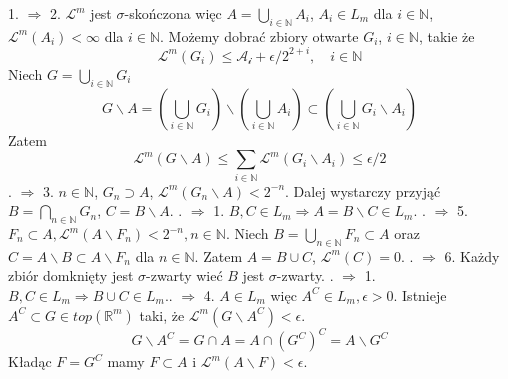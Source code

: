 
	1. $\Longrightarrow$ 2. $\mathcal{L}^m$ jest $\sigma$-skończona więc $A = \bigcup_{i \in \mathbb{N}} A_i$, $A_i \in L_m$ dla $i \in \mathbb{N}$, $\mathcal{L}^m(A_i) < \infty$ dla $i \in \mathbb{N}$. Możemy dobrać zbiory otwarte $G_i$, $i \in \mathbb{N}$, takie że $$ \mathcal{L}^m(G_i) \leq \mathcal{A_i} + \epsilon / 2^{2 + i}, \quad i \in \mathbb{N} $$  Niech $G = \bigcup_{i \in \mathbb{N}} G_i$ $$ G \backslash A = (\bigcup_{i \in \mathbb{N}} G_i) \backslash (\bigcup_{i \in \mathbb{N}} A_i) \subset (\bigcup_{i \in \mathbb{N}} G_i \backslash A_i) $$ Zatem $$ \mathcal{L}^m(G \backslash A) \leq \sum_{i \in \mathbb{N}} \mathcal{L}^m(G_i \backslash A_i) \leq \epsilon/2 $$. $\Longrightarrow$ 3. $n \in \mathbb{N}$, $G_n \supset A$, $\mathcal{L}^m(G_n \backslash A) < 2^{-n}$. Dalej wystarczy przyjąć $B = \bigcap_{n \in \mathbb{N}} G_n$, $C = B \backslash A$. . $\Longrightarrow$ 1. $B, C \in L_m \Longrightarrow A = B \backslash C \in L_m$. . $\Longrightarrow$ 5. $F_n \subset A, \mathcal{L}^m(A \backslash F_n) < 2^{-n}, n \in \mathbb{N}$. Niech $B = \bigcup_{n \in \mathbb{N}} F_n \subset A$ oraz $C = A \backslash B \subset A \backslash F_n$ dla $n \in \mathbb{N}$. Zatem $A = B \cup C$, $\mathcal{L}^m(C)=0$.  . $\Longrightarrow$ 6. Każdy zbiór domknięty jest $\sigma$-zwarty wieć $B$ jest $\sigma$-zwarty. . $\Longrightarrow$ 1. $B,C \in L_m \Longrightarrow B \cup C \in L_m$.. $\Longrightarrow$ 4. $A \in L_m$ więc $A^C \in L_m, \epsilon > 0$. Istnieje $A^C \subset G \in top(\mathbb{R}^m)$ taki, że $\mathcal{L}^m(G \backslash A^C) < \epsilon$. $$ G \backslash A^C = G \cap A = A \cap (G^C)^C = A \backslash G^C $$ Kładąc $F = G^C$ mamy $F \subset A$ i $\mathcal{L}^m(A \backslash F) < \epsilon$. \newline
